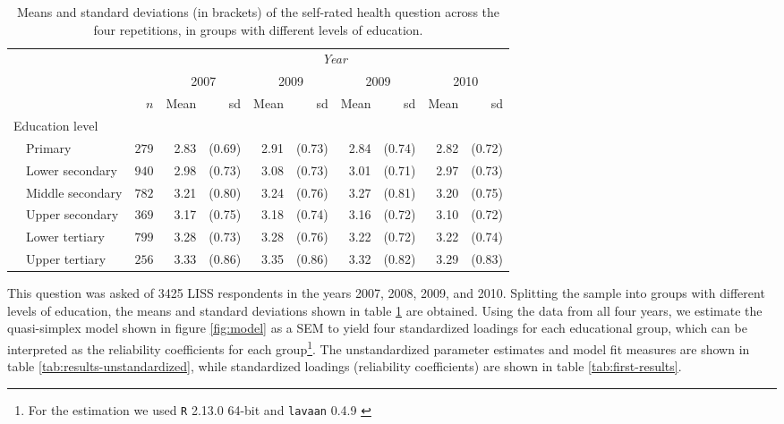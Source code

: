 \documentclass[a4paper, 11pt]{article}
\newcommand{\0}{\boldsymbol{0}}
\newcommand{\R}{\texttt{R} 2.13.0 64-bit \citep{R}\;}
\newcommand{\lavaan}{\texttt{lavaan} 0.4.9 \citep{lavaan}\;}
\begin{document}
\begin{table}[bt]\begin{small}
\begin{center}
\begin{tabular}{llrrrrrrrrr}  \hline  \hline
&&&  \multicolumn{8}{c}{\emph{Year}}\\\cline{4-11}
&&& \multicolumn{2}{c}{2007} & \multicolumn{2}{c}{2009} & \multicolumn{2}{c}{2009} & \multicolumn{2}{c}{2010} \\
&&$n$&Mean&sd&Mean&sd&Mean&sd&Mean&sd\\
  \hline
  \multicolumn{2}{l}{Education level}\\
 
& Primary	  & $279$ & 2.83 & (0.69) & 2.91 & (0.73) & 2.84 & (0.74) & 2.82 & (0.72) \\ 
& Lower secondary  & $940$ & 2.98 & (0.73) & 3.08 & (0.73) & 3.01 & (0.71) & 2.97 & (0.73) \\ 
& Middle secondary & $782$ & 3.21 & (0.80) & 3.24 & (0.76) & 3.27 & (0.81) & 3.20 & (0.75) \\ 
& Upper secondary  & $369$ & 3.17 & (0.75) & 3.18 & (0.74) & 3.16 & (0.72) & 3.10 & (0.72) \\ 
& Lower tertiary	  & $799$ & 3.28 & (0.73) & 3.28 & (0.76) & 3.22 & (0.72) & 3.22 & (0.74) \\ 
& Upper tertiary	  & $256$ & 3.33 & (0.86) & 3.35 & (0.86) & 3.32 & (0.82) & 3.29 & (0.83) \\ 
   \hline
   \hline
\end{tabular}
\caption{Means and standard deviations (in brackets) of the self-rated health question across the four repetitions, in 
groups with different levels of education.}\label{tab:descriptives}
\end{center}\end{small}
\end{table}

This question was asked of 3425 LISS respondents in the years 2007, 2008, 2009, and 2010. Splitting the sample into
groups with different levels of education, the means and standard deviations shown in table \ref{tab:descriptives} are obtained.
Using the data from all four years, we estimate the  quasi-simplex model shown in figure \ref{fig:model} as a SEM
to yield four standardized loadings for each educational group, which can be interpreted as the reliability coefficients for each group\footnote{For the estimation we used \R and \lavaan}. The unstandardized parameter estimates and model fit measures are shown in table \ref{tab:results-unstandardized}, while standardized loadings (reliability coefficients) are shown in table \ref{tab:first-results}.
\end{document}
